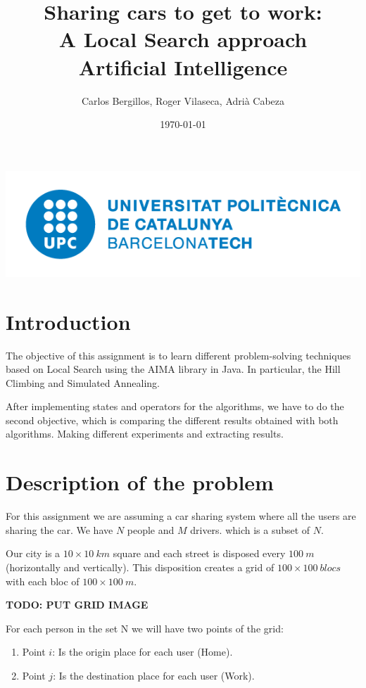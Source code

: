\documentclass[12]{article}
\author{Carlos Bergillos, Roger Vilaseca, Adrià Cabeza}
\title{\textbf{Sharing cars to get to work:\\ A Local Search approach}\\ \bigskip Artificial Intelligence}
\date{\today}
\begin{document}
\maketitle
\vspace*{\fill}
\begin{center}
\includegraphics[scale=0.5]{images/UPClogo.png}
\end{center}

\newpage
\tableofcontents
\newpage
\section{Introduction}

The objective of this assignment is to learn different problem-solving techniques based on Local Search using the AIMA library in Java.
In particular, the Hill Climbing and Simulated Annealing.

After implementing states and operators for the algorithms, we have to do the second objective, which is comparing the different results obtained with both algorithms.
Making different experiments and extracting results.

\section{Description of the problem}

For this assignment we are assuming a car sharing system where all the users are sharing the car. We have $N$ people and $M$ drivers. which is a subset of $N$. 

Our city is a $10\times10\ km$ square and each street is disposed every $100\ m$ (horizontally and vertically). This disposition creates a grid of $100\times100\ blocs$ with each bloc of $100\times100\ m$.

\textbf{TODO: PUT GRID IMAGE}

For each person in the set N we will have two points of the grid:

\begin{enumerate}
  \item Point $i$: Is the origin place for each user (Home).
  \item Point $j$: Is the destination place for each user (Work). 
\end{enumerate}
\end{document}
